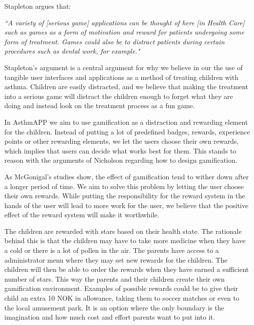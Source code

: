 Stapleton argues that:

\textit{``A variety of [serious game] applications can be thought of here [in Health Care] such as games as a form of motivation and reward for patients undergoing some form of treatment. Games could also be to distract patients during certain procedures such as dental work, for example."}\cite{stapleton2004serious}


Stapleton's argument is a central argument for why we believe in our the use of tangible user interfaces and applications as a method of treating children with asthma. Children are easily distracted, and we believe that making the treatment into a serious game will distract the children enough to forget what they are doing and instead look on the treatment process as a fun game.


In AsthmAPP we aim to use gamification as a distraction and rewarding element for the children. Instead of putting a lot of predefined badges, rewards, experience points or other rewarding elements, we let the users choose their own rewards, which implies that users can decide what works best for them. This stands to reason with the arguments of Nicholson\cite{nicholson2012user} regarding how to design gamification.

As McGonigal's studies show, the effect of gamification tend to wither down after a longer period of time\cite{jane2011reality}. We aim to solve this problem by letting the user choose their own rewards. While putting the responsibility for the reward system in the hands of the user will lead to more work for the user, we believe that the positive effect of the reward system will make it worthwhile. 
 

The children are rewarded with stars based on their health state. The rationale behind this is that the children may have to take more medicine when they have a cold or there is a lot of pollen in the air. The parents have access to a administrator menu where they may set new rewards for the children. The children will then be able to order the rewards when they have earned a sufficient number of stars. This way the parents and their children create their own gamification environment. Examples of possible rewards could be to give their child an extra 10 NOK in allowance, taking them to soccer matches or even to the local amusement park. It is an option where the only boundary is the imagination and how much cost and effort parents want to put into it.    



